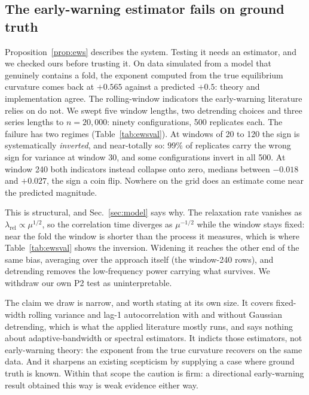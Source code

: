 \documentclass[conference]{IEEEtran}
\begin{document}
\subsection{The early-warning estimator fails on ground truth}
Proposition~\ref{prop:ews} describes the system. Testing it needs an estimator,
and we checked ours before trusting it. On data simulated from a model that
genuinely contains a fold, the exponent computed from the true equilibrium
curvature comes back at $+0.565$ against a predicted $+0.5$: theory and
implementation agree. The rolling-window indicators the early-warning literature
relies on \cite{scheffer2009,dakos2012} do not. We swept five window lengths,
two detrending choices and three series lengths to $n=20{,}000$: ninety
configurations, 500 replicates each. The failure has two regimes
(Table~\ref{tab:ewsval}). At windows of 20 to 120 the sign is systematically
\emph{inverted}, and near-totally so: $99\%$ of replicates carry the wrong
sign for variance at window 30, and some configurations invert in all 500. At
window 240 both indicators instead collapse onto zero, medians between $-0.018$
and $+0.027$, the sign a coin flip. Nowhere on the grid does an estimate come
near the predicted magnitude.

This is structural, and Sec.~\ref{sec:model} says why. The relaxation rate
vanishes as $\lambda_{\text{rel}}\propto\mu^{1/2}$, so the correlation time
diverges as $\mu^{-1/2}$ while the window stays fixed: near the fold the window
is shorter than the process it measures, which is where
Table~\ref{tab:ewsval} shows the inversion. Widening it reaches the other end
of the same bias, averaging over the approach itself (the window-240 rows), and
detrending removes the low-frequency power carrying what survives. We
withdraw our own P2 test as uninterpretable.

The claim we draw is narrow, and worth stating at its own size. It covers
fixed-width rolling variance and lag-1 autocorrelation with and without
Gaussian detrending, which is what the applied literature mostly runs, and says
nothing about adaptive-bandwidth or spectral estimators. It indicts those
estimators, not early-warning theory: the exponent from the true curvature
recovers on the same data. And it sharpens an existing scepticism
\cite{ditlevsen2010,boettiger2012} by supplying a case where ground truth is
known. Within that scope the caution is firm: a directional early-warning
result obtained this way is weak evidence either way.
\end{document}
